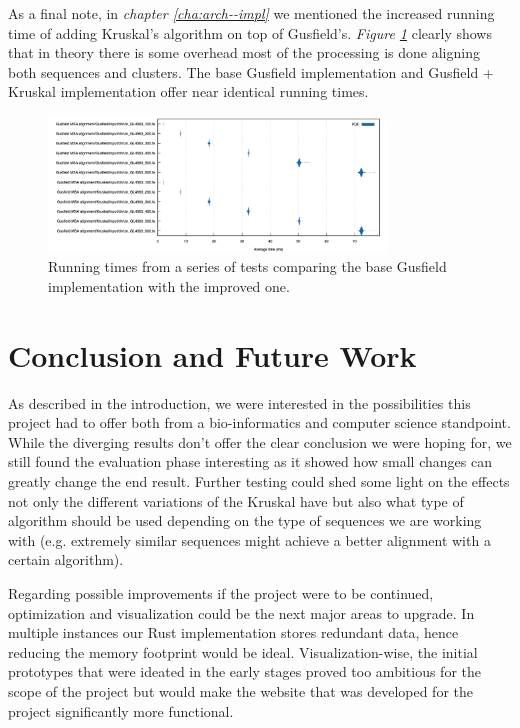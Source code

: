 \documentclass[twoside,openright,titlepage,numbers=noenddot,headinclude,%
                footinclude=true,cleardoublepage=empty,abstractoff, %
                BCOR=5mm,paper=a4,fontsize=11pt,%
                ngerman,american,%
                ]{scrreprt}
\begin{document}
As a final note, in \textit{chapter \ref{cha:arch--impl}} we mentioned the increased running time of adding Kruskal's algorithm on top of Gusfield's. \textit{Figure \ref{fig:running-times}} clearly shows that in theory there is some overhead most of the processing is done aligning both sequences and clusters. The base Gusfield implementation and Gusfield + Kruskal implementation offer near identical running times.

\begin{figure}[h]
\includegraphics[width=0.8\textwidth]{report/runing-times.png}
\centering
\caption{Running times from a series of tests comparing the base Gusfield implementation with the improved one.}
\label{fig:running-times}
\end{figure}

\section{Conclusion and Future Work}
As described in the introduction, we were interested in the possibilities this project had to offer both from a bio-informatics and computer science standpoint. While the diverging results don't offer the clear conclusion we were hoping for, we still found the evaluation phase interesting as it showed how small changes can greatly change the end result. Further testing could shed some light on the effects not only the different variations of the Kruskal have but also what type of algorithm should be used depending on the type of sequences we are working with (e.g. extremely similar sequences might achieve a better alignment with a certain algorithm).

Regarding possible improvements if the project were to be continued, optimization and visualization could be the next major areas to upgrade. In multiple instances our Rust implementation stores redundant data, hence reducing the memory footprint would be ideal. Visualization-wise, the initial prototypes that were ideated in the early stages proved too ambitious for the scope of the project but would make the website that was developed for the project significantly more functional. 
\end{document}

